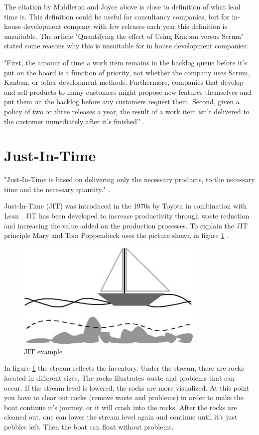 \documentclass[UKenglish]{ifimaster}  %
\begin{document}
The citation by Middleton and Joyce above is close to definition of what lead time is. This definition could be useful for consultancy companies, but for in-house development company with few releases each year this definition is unsuitable. The article "Quantifying the effect of Using Kanban versus Scrum" \parencite{Dag} stated some reasons why this is unsuitable for in house development companies: 

"First, the amount of time a work item remains in the backlog queue before it's put on the board is a function of priority, not whether the company uses Scrum, Kanban, or other development methods. Furthermore, companies that develop and sell products to many customers might propose new features themselves and put them on the backlog before any customers request them. Second, given a policy of two or three releases a year, the result of a work item isn't delivered to the customer immediately after it's finished'' \parencite{Dag}.


\section{Just-In-Time}
"Just-In-Time is based on delivering only the necessary products, to the necessary time and the necessary quantity." \parencite{JIT}.

Just-In-Time (JIT) was introduced in the 1970s by Toyota in combination with Lean \parencite{javadian2013just}.  JIT has been developed to increase productivity through waste reduction and increasing the value added on the production processes. To explain the JIT principle Mary and Tom Poppendieck uses the picture shown in figure \ref{JITE}  \parencite{JIT} \parencite{Lean:2006}.

\begin{figure}[ht!]
\centering
\includegraphics[width=90mm]{Picture/JIT.jpg}
\caption{JIT example}
\label{JITE} %
\end{figure}


In figure \ref{JITE} the stream reflects the inventory.  Under the stream, there are rocks located in different sizes. The rocks illustrates waste and problems that can occur.  If the stream level is lowered, the rocks are more visualized. At this point you have to clear out rocks (remove waste and problems) in order to make the boat continue it's journey, or it will crash into the rocks. After the rocks are cleaned out, one can lower the stream level again and continue until it's just pebbles left. Then the boat can float without problems.
\end{document}
